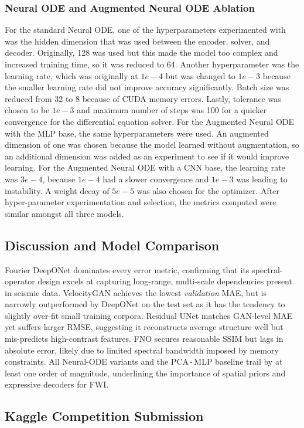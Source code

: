 \documentclass{article}
\begin{document}
\subsubsection{Neural ODE and Augmented Neural ODE Ablation}
For the standard Neural ODE, one of the hyperparameters experimented with was the hidden dimension that was used between the encoder, solver, and decoder. Originally, 128 was used but this made the model too complex and increased training time, so it was reduced to 64. Another hyperparameter was the learning rate, which was originally at $1e-4$ but was changed to $1e-3$ because the smaller learning rate did not improve accuracy significantly. Batch size was reduced from 32 to 8 because of CUDA memory errors. Lastly, tolerance was chosen to be $1e-3$ and maximum number of steps was 100 for a quicker convergence for the differential equation solver. For the Augmented Neural ODE with the MLP base, the same hyperparameters were used. An augmented dimension of one was chosen because the model  learned without augmentation, so an additional dimension was added as an experiment to see if it would improve learning. For the Augmented Neural ODE with a CNN base, the learning rate was $3e-4$, because $1e-4$ had a slower convergence and $1e-3$ was leading to instability. A weight decay of $5e-5$ was also chosen for the optimizer. After hyper-parameter experimentation and selection, the metrics computed were similar amongst all three models.

\subsection{Discussion and Model Comparison}
Fourier DeepONet dominates every error metric, confirming that its
spectral-operator design excels at capturing long-range, multi-scale
dependencies present in seismic data.
VelocityGAN achieves the lowest \emph{validation} MAE, but is narrowly
outperformed by DeepONet on the test set as it has the tendency to
slightly over-fit small training corpora.
Residual UNet matches GAN-level MAE yet suffers larger RMSE, suggesting it
reconstructs average structure well but mis-predicts high-contrast features.
FNO secures reasonable SSIM but lags in absolute error, likely due to limited
spectral bandwidth imposed by memory constraints.
All Neural-ODE variants and the PCA\,-\,MLP baseline trail by at least one
order of magnitude, underlining the importance of spatial priors and expressive
decoders for FWI.

\subsection{Kaggle Competition Submission}
\end{document}
